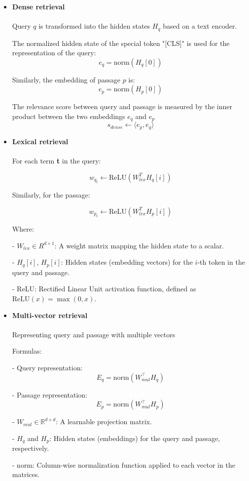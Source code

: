 \begin{itemize}
    \item \textbf{Dense retrieval} \\\\
Query $q$ is transformed into the hidden states $H_q$ based on a text encoder.

The normalized hidden state of the special token "[CLS]" is used for the representation of the query:
$$ e_q = \text{norm}(H_q[0]) $$

Similarly, the embedding of passage $p$ is:
$$ e_p = \text{norm}(H_p[0]) $$

The relevance score between query and passage is measured by the inner product between the two embeddings $e_q$ and $e_p$
$$ s_{dense} \leftarrow \langle e_p, e_q \rangle $$
    \item \textbf{Lexical retrieval}\\\\
For each term \textbf{t} in the query:

$$ w_{q_t} \leftarrow \text{ReLU}(W^T_{lex} H_q[i]) $$

Similarly, for the passage:

$$ w_{p_t} \leftarrow \text{ReLU}(W^T_{lex} H_p[i]) $$

Where:

- $W_{lex} \in R^{d \times 1}$: A weight matrix mapping the hidden state to a scalar.

- $H_q[i]$, $H_p[i]$: Hidden states (embedding vectors) for the $i$-th token in the query and passage.

- ReLU: Rectified Linear Unit activation function, defined as $\text{ReLU}(x) = \max(0, x)$.
    \item \textbf{Multi-vector retrieval}\\\\
Representing query and passage with multiple vectors

Formulas:

- Query representation:  
  $$ E_q = \text{norm}(W_{mul}^\top H_q) $$

- Passage representation:  
  $$ E_p = \text{norm}(W_{mul}^\top H_p) $$

- $W_{mul} \in \mathbb{R}^{d \times d}$: A learnable projection matrix.

- $H_q$ and $H_p$: Hidden states (embeddings) for the query and passage, respectively.

- norm: Column-wise normalization function applied to each vector in the matrices.
\end{itemize}

